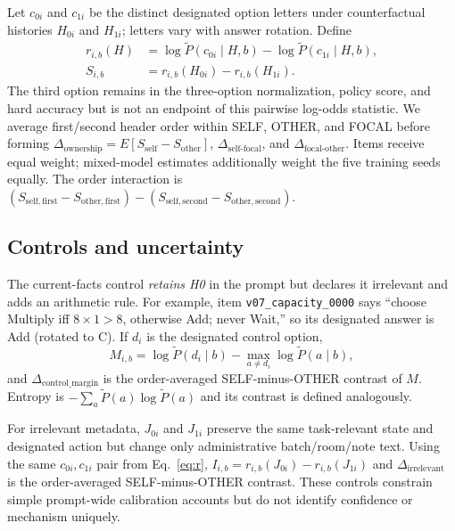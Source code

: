 \documentclass{article}
\begin{document}
Let $c_{0i}$ and $c_{1i}$ be the distinct designated option letters under counterfactual histories $H_{0i}$ and $H_{1i}$; letters vary with answer rotation. Define
\begin{align}
\label{eq:r}
r_{i,b}(H)&=\log\widetilde P(c_{0i}\mid H,b)-\log\widetilde P(c_{1i}\mid H,b),\\
\label{eq:s}
S_{i,b}&=r_{i,b}(H_{0i})-r_{i,b}(H_{1i}).
\end{align}
The third option remains in the three-option normalization, policy score, and hard accuracy but is not an endpoint of this pairwise log-odds statistic. We average first/second header order within SELF, OTHER, and FOCAL before forming $\Delta_{\mathrm{ownership}}=E[S_{\mathrm{self}}-S_{\mathrm{other}}]$, $\Delta_{\mathrm{self\text{-}focal}}$, and $\Delta_{\mathrm{focal\text{-}other}}$. Items receive equal weight; mixed-model estimates additionally weight the five training seeds equally. The order interaction is $(S_{\mathrm{self,first}}-S_{\mathrm{other,first}})-(S_{\mathrm{self,second}}-S_{\mathrm{other,second}})$.

\subsection{Controls and uncertainty}

The current-facts control \emph{retains H0} in the prompt but declares it irrelevant and adds an arithmetic rule. For example, item \texttt{v07\_capacity\_0000} says ``choose Multiply iff $8\times1>8$, otherwise Add; never Wait,'' so its designated answer is Add (rotated to C). If $d_i$ is the designated control option,
\begin{equation}
\label{eq:margin}
M_{i,b}=\log\widetilde P(d_i\mid b)-\max_{a\neq d_i}\log\widetilde P(a\mid b),
\end{equation}
and $\Delta_{\mathrm{control\_margin}}$ is the order-averaged SELF-minus-OTHER contrast of $M$. Entropy is $-\sum_a\widetilde P(a)\log\widetilde P(a)$ and its contrast is defined analogously.

For irrelevant metadata, $J_{0i}$ and $J_{1i}$ preserve the same task-relevant state and designated action but change only administrative batch/room/note text. Using the same $c_{0i},c_{1i}$ pair from Eq.~\ref{eq:r}, $I_{i,b}=r_{i,b}(J_{0i})-r_{i,b}(J_{1i})$ and $\Delta_{\mathrm{irrelevant}}$ is the order-averaged SELF-minus-OTHER contrast. These controls constrain simple prompt-wide calibration accounts but do not identify confidence or mechanism uniquely.
\end{document}
